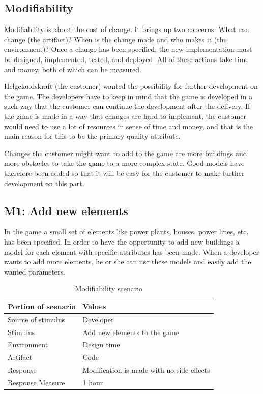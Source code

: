 \subsection{Modifiability}

Modifiability \cite{attributes} is about the cost of change. It brings up two concerns: 
What can change (the artifact)? 
When is the change made and who makes it (the environment)? 
Once a change has been specified, the new implementation must be designed, 
implemented, tested, and deployed. All of these actions take time and money, both of which can be measured.

Helgelandskraft (the customer) wanted the possibility for further development on the game. The developers
have to keep in mind that the game is developed in a such way that the customer can continue
the development after the delivery. If the game is made in a way that changes are hard to implement, 
the customer would need to use a lot of resources in sense of time and money, and that is the main 
reason for this to be the primary quality attribute.

Changes the customer might want to add to the game are more buildings and more obstacles to take
the game to a more complex state. Good models have therefore been added so that it will be easy for 
the customer to make further development on this part.

\subsection*{M1: Add new elements}
In the game a small set of elements like power plants, houses, power lines, etc. has been specified.
In order to have the oppertunity to add new buildings a model for each element with specific attributes has been made. When a developer wants to add more elements, he or she can use these models and easily add the wanted parameters. 

\begin{table}[H]
\begin{tabular}{| l | l |}
	\hline
	\rowcolor{gray}
	{\bf Portion of scenario} & {\bf Values} \\ \hline
	Source of stimulus & Developer\\ \hline
	Stimulus & Add new elements to the game\\ \hline
	Environment & Design time \\ \hline
	Artifact & Code \\ \hline
	Response & Modification is made with no side effects\\ \hline
	Response Measure & 1 hour\\ \hline
\end{tabular}
\caption{Modifiability scenario}
\end{table}

